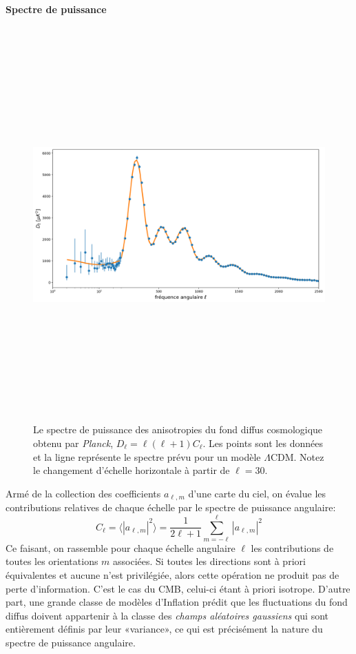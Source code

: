 \paragraph{Spectre de puissance}
\begin{figure}[htbp]
	\centering
		\includegraphics[height=15cm]{figs/cl2015.png}
		\caption[Le spectre de puissance des anisotropies du fond diffus cosmologique obtenu par \textit{Planck}.]{Le spectre de puissance des anisotropies du fond diffus cosmologique obtenu par \textit{Planck}, $D_\ell=\ell(\ell+1)C_\ell$. Les points sont les données et la ligne représente le spectre prévu pour un modèle $\Lambda$CDM. Notez le changement d'échelle horizontale à partir de $\ell=30$.}
	\label{f:cl}
\end{figure}

Armé de la collection des coefficients $a_{\ell,m}$ d'une carte du ciel, on évalue les contributions relatives de chaque échelle par le spectre de puissance angulaire:
\begin{equation}
C_\ell=\langle |a_{\ell,m}|^2\rangle=\frac{1}{2\ell+1}\sum_{m=-\ell}^{\ell} |a_{\ell,m}|^2
\end{equation}
Ce faisant, on rassemble pour chaque échelle angulaire $\ell$ les contributions de toutes les orientations $m$ associées. Si toutes les directions sont à priori équivalentes et aucune n'est privilégiée, alors cette opération ne produit pas de perte d'information. C'est le cas du CMB, celui-ci étant à priori isotrope. D'autre part, une grande classe de modèles d'Inflation prédit que les fluctuations du fond diffus doivent appartenir à la classe des \textit{champs aléatoires gaussiens} qui sont entièrement définis par leur «variance», ce qui est précisément la nature du spectre de puissance angulaire.

